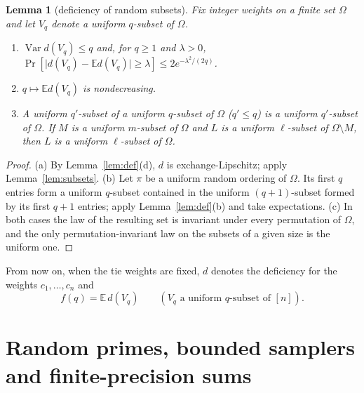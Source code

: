 \documentclass[11pt]{article}
\newtheorem{lemma}{Lemma}[section]
\theoremstyle{definition}
\newcommand{\E}{\mathbb E}
\newcommand{\abs}[1]{\lvert #1\rvert}
\newcommand{\Var}{\operatorname{Var}}
\begin{document}
\begin{lemma}[deficiency of random subsets]\label{lem:fmono}
Fix integer weights on a finite set $\Omega$ and let $V_q$ denote a uniform $q$-subset of $\Omega$.
\begin{enumerate}[label=\textup{(\alph*)}]
\item $\Var d(V_q)\le q$ and, for $q\ge1$ and $\lambda>0$,
$\Pr[\abs{d(V_q)-\E d(V_q)}\ge\lambda]\le2e^{-\lambda^2/(2q)}$.
\item $q\mapsto\E d(V_q)$ is nondecreasing.
\item A uniform $q'$-subset of a uniform $q$-subset of $\Omega$ ($q'\le q$) is a uniform $q'$-subset of $\Omega$. If
$M$ is a uniform $m$-subset of $\Omega$ and $L$ is a uniform $\ell$-subset of $\Omega\setminus M$, then $L$ is a
uniform $\ell$-subset of $\Omega$.
\end{enumerate}
\end{lemma}
\begin{proof}
(a) By Lemma~\ref{lem:def}(d), $d$ is exchange-Lipschitz; apply Lemma~\ref{lem:subsets}. (b) Let $\pi$ be a uniform
random ordering of $\Omega$. Its first $q$ entries form a uniform $q$-subset contained in the uniform
$(q+1)$-subset formed by its first $q+1$ entries; apply Lemma~\ref{lem:def}(b) and take expectations. (c) In both
cases the law of the resulting set is invariant under every permutation of $\Omega$, and the only
permutation-invariant law on the subsets of a given size is the uniform one.
\end{proof}

From now on, when the tie weights are fixed, $d$ denotes the deficiency for the weights $c_1,\dots,c_n$ and
\begin{equation}\label{eq:f}
 f(q)=\E\,d(V_q)\qquad(V_q\text{ a uniform }q\text{-subset of }[n]).
\end{equation}
\section{Random primes, bounded samplers and finite-precision sums}\label{sec:prims}
\end{document}
